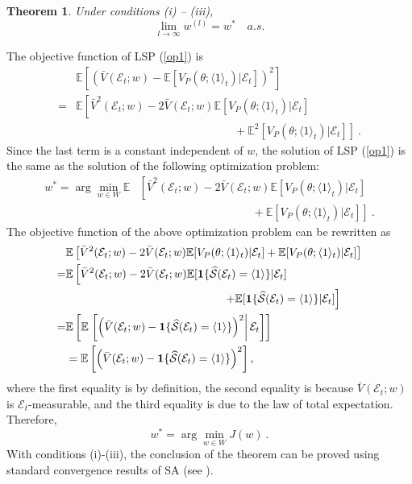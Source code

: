 \documentclass[journal]{IEEEtran}
\newtheorem{theorem}{Theorem}
\begin{document}
  \begin{theorem}\label{thm4}
  Under conditions (i) -- (iii),  $$\lim_{l\to\infty} w^{(l)}=w^{*}\quad a.s.$$ 
  \end{theorem}  \begin{IEEEproof}  The objective function of LSP (\ref{op1}) is 
      \begin{align*}
     &\mathbb{E}\left[ \left(\bar{V}(\mathcal{E}_t;w)-\mathbb{E}[V_P(\theta;\langle 1 \rangle_t)| \mathcal{E}_t]\right)^2\right]\\
     =& \mathbb{E}\left[ \bar{V}^2(\mathcal{E}_t;w)-2\bar{V}(\mathcal{E}_t;w)\mathbb{E}[V_P(\theta;\langle 1 \rangle_t)| \mathcal{E}_t]\right.\\
     &\left.\qquad\qquad\qquad\qquad\qquad\qquad\qquad+\mathbb{E}^2[V_P(\theta;\langle 1 \rangle_t)| \mathcal{E}_t]\right]~.
      \end{align*}
      Since the last term is a constant independent of $w$, the solution of  LSP (\ref{op1}) is the same as the solution of the following optimization problem:
        \begin{align*}
       w^{*}=\arg\min_{w\in W}\mathbb{E}&\left[ \bar{V}^2(\mathcal{E}_t;w)-2\bar{V}(\mathcal{E}_t;w)\mathbb{E}[V_P(\theta;\langle 1 \rangle_t)| \mathcal{E}_t]\right.\\
       &\left.\qquad\qquad\qquad\qquad\qquad+\mathbb{E}[V_P(\theta;\langle 1 \rangle_t)| \mathcal{E}_t]\right]~.
        \end{align*}
        The objective function of the above optimization problem can be rewritten as 
       \begin{align*}
       &\mathbb{E}\left[ \bar{V}^2(\mathcal{E}_t;w)-2\bar{V}(\mathcal{E}_t;w) \mathbb{E}[V_P(\theta;\langle 1 \rangle_t)| \mathcal{E}_t]+\mathbb{E}[V_P(\theta;\langle 1 \rangle_t)| \mathcal{E}_t]\right]\\
       =&\mathbb{E}\left[ \bar{V}^2(\mathcal{E}_t;w)-2\bar{V}(\mathcal{E}_t;w)\mathbb{E}[{\bf1}\{ \widehat{\mathcal{S}}(\mathcal{E}_t)=\langle 1 \rangle \}| \mathcal{E}_t]\right.\\
       &\qquad\qquad\qquad\qquad\qquad\qquad\qquad\left.+\mathbb{E}[{\bf1}\{ \widehat{\mathcal{S}}(\mathcal{E}_t)=\langle 1 \rangle \}| \mathcal{E}_t]\right]\\
       =&\mathbb{E}\left[ \mathbb{E}\left.\left[\left(\bar{V}(\mathcal{E}_t;w)-{\bf1}\{ \widehat{\mathcal{S}}(\mathcal{E}_t)=\langle 1 \rangle \}\right)^2\right| \mathcal{E}_t\right]\right]\\
       &=\mathbb{E}\left[\left(\bar{V}(\mathcal{E}_t;w)-{\bf1}\{ \widehat{\mathcal{S}}(\mathcal{E}_t)=\langle 1 \rangle\}\right)^2\right],
         \end{align*}  
         where the first equality is by definition, the second equality is because $\bar{V}(\mathcal{E}_t;w)$ is $\mathcal{E}_t$-measurable, and the third equality is due to the law of total expectation. Therefore, $$w^{*}=\arg\min_{w\in W} J(w)~.$$         
         With conditions (i)-(iii), the conclusion of the theorem can be proved using standard convergence results of SA (see \cite{yin2003stochastic}).
 \end{IEEEproof}
\end{document}
